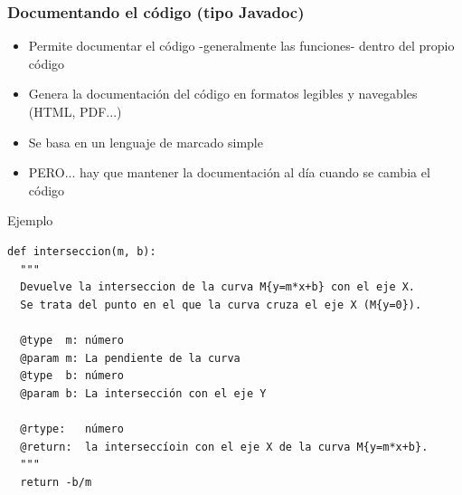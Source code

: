 \documentclass{beamer}
\begin{document}
\begin{frame}
\frametitle{Documentando el código (tipo Javadoc)}

\begin{small}
\begin{itemize}
\item Permite documentar el código -generalmente las funciones- dentro del propio código
\item Genera la documentación del código en formatos legibles y navegables
(HTML, PDF...)
\item Se basa en un lenguaje de marcado simple
\item PERO... hay que mantener la documentación al día cuando se cambia
el código
\end{itemize}
\end{small}
\end{frame}

\begin{frame}[fragile]
Ejemplo

\begin{small}
\begin{verbatim}
def interseccion(m, b):
  """
  Devuelve la interseccion de la curva M{y=m*x+b} con el eje X. 
  Se trata del punto en el que la curva cruza el eje X (M{y=0}).

  @type  m: número
  @param m: La pendiente de la curva
  @type  b: número
  @param b: La intersección con el eje Y

  @rtype:   número
  @return:  la interseccíoin con el eje X de la curva M{y=m*x+b}.
  """
  return -b/m
\end{verbatim}
\end{small}
  
\end{frame}




\frame{
\maketitle
}
\end{document}

